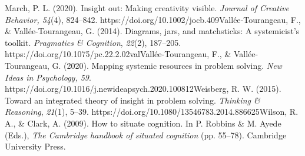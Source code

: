 March, P. L. (2020). Insight out: Making creativity visible.
\emph{Journal of Creative Behavior, 54}(4), 824­--842.
https://doi.org/10.1002/jocb.409Vallée‐Tourangeau, F., \&
Vallée-Tourangeau, G. (2014). Diagrams, jars, and matchsticks: A
systemicist's toolkit. \emph{Pragmatics \& Cognition}, \emph{22}(2),
187--205. https://doi.org/10.1075/pc.22.2.02valVallée-Tourangeau, F., \&
Vallée-Tourangeau, G. (2020). Mapping systemic resources in problem
solving. \emph{New Ideas in Psychology, 59}.
https://doi.org/10.1016/j.newideapsych.2020.100812Weisberg, R. W.
(2015). Toward an integrated theory of insight in problem solving.
\emph{Thinking \& Reasoning}, \emph{21}(1), 5--39.
https://doi.org/10.1080/13546783.2014.886625Wilson, R. A., \& Clark, A.
(2009). How to situate cognition. In P. Robbins \& M. Ayede (Eds.),
\emph{The Cambridge handbook of situated cognition} (pp. 55--78).
Cambridge University Press.
